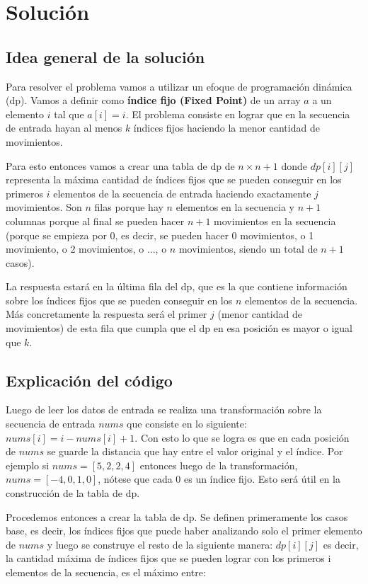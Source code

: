 \documentclass[11pt]{article}
\begin{document}
    \section{Solución}
    \subsection{Idea general de la solución}
    Para resolver el problema vamos a utilizar un efoque de programación dinámica (dp). Vamos a definir como
    \textbf{índice fijo (Fixed Point)} de un array $a$ a un elemento $i$ tal que $a[i] = i$. El problema consiste
    en lograr que en la secuencia de entrada hayan al menos $k$ índices fijos haciendo la menor cantidad de movimientos.

    Para esto entonces vamos a crear una tabla de dp de $n \times n+1$ donde $dp[i][j]$ representa la máxima cantidad
    de índices fijos que se pueden conseguir en los primeros $i$ elementos de la secuencia de entrada haciendo
    exactamente $j$ movimientos. Son $n$ filas porque hay $n$ elementos en la secuencia y $n+1$ columnas porque al
    final se pueden hacer $n+1$ movimientos en la secuencia (porque se empieza por 0, es decir, se pueden hacer
    0 movimientos, o 1 movimiento, o 2 movimientos, o ..., o $n$ movimientos, siendo un total de $n+1$ casos).

    La respuesta estará en la última fila del dp, que es la que contiene información sobre los índices fijos que se
    pueden conseguir en los $n$ elementos de la secuencia. Más concretamente la respuesta será el primer $j$ (menor
    cantidad de movimientos) de esta fila que cumpla que el dp en esa posición es mayor o igual que $k$.

    \subsection{Explicación del código}
    Luego de leer los datos de entrada se realiza una transformación sobre la secuencia de entrada $nums$ que consiste
    en lo siguiente: $nums[i] = i - nums[i] + 1$. Con esto lo que se logra es que en cada posición de $nums$ se guarde
    la distancia que hay entre el valor original y el índice. Por ejemplo si $nums = [5,2,2,4]$ entonces luego de la
    transformación, $nums = [-4, 0, 1, 0]$, nótese que cada 0 es un índice fijo. Esto será útil en la construcción de 
    la tabla de dp.

    Procedemos entonces a crear la tabla de dp. Se definen primeramente los casos base, es decir, los índices fijos
    que puede haber analizando solo el primer elemento de $nums$ y luego se construye el resto de la siguiente manera:
    $dp[i][j]$ es decir, la cantidad máxima de índices fijos que se pueden lograr con los primeros i elementos de la
    secuencia, es el máximo entre:
\end{document}
